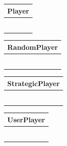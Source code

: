 \documentclass[12pt]{article}
\begin{document}
\begin{enumerate}[1.]
    \begin{figure}[h]
        \centering
        \begin{tabular}{|p{3.25cm}|}
            \hline
            \textbf{Player}\\
            \hline
            \\
            \\
            \\
            \hline
            \\
            \\
            \\
            \hline
        \end{tabular}
        \begin{tabular}{|p{3.25cm}|}
            \hline
            \textbf{RandomPlayer}\\
            \hline
            \\
            \\
            \\
            \hline
            \\
            \\
            \\
            \hline
        \end{tabular}
        \begin{tabular}{|p{3.25cm}|}
            \hline
            \textbf{StrategicPlayer}\\
            \hline
            \\
            \\
            \\
            \hline
            \\
            \\
            \\
            \hline
        \end{tabular}
        \begin{tabular}{|p{3.25cm}|}
            \hline
            \textbf{UserPlayer}\\
            \hline
            \\
            \\
            \\
            \hline
            \\
            \\
            \\
            \hline
        \end{tabular}
    \end{figure}


\end{enumerate}
\end{document}
